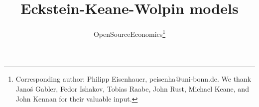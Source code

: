 
\title{Eckstein-Keane-Wolpin models}
\author{OpenSourceEconomics\thanks{Corresponding author: Philipp Eisenhauer, peisenha@uni-bonn.de. We thank  Jano\'s Gabler, Fedor Ishakov, Tobias Raabe, John Rust, Michael Keane, and John Kennan for their valuable input.}}
\date{}
